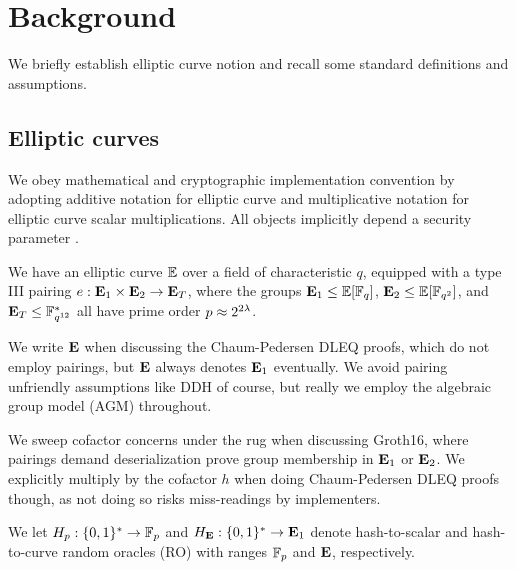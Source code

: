 
\section{Background}
\label{sec:background}

We briefly establish elliptic curve notion and recall some standard
definitions and assumptions.



\subsection{Elliptic curves}


We obey mathematical and cryptographic implementation convention by 
adopting additive notation for elliptic curve and multiplicative notation
for elliptic curve scalar multiplications.
%
All objects implicitly depend a security parameter \secparam.

We have an elliptic curve ${\mathbb{E}}$ over a field of characteristic $q$,
equipped with a type III pairing $e : {\mathbf{E}}_1 \times {\mathbf{E}}_2 \to {\mathbf{E}}_T$,
where the groups  ${\mathbf{E}}_1 \le {\mathbb{E}}[\mathbb{F}_q]$, ${\mathbf{E}}_2 \le {\mathbb{E}}[\mathbb{F}_{q^2}]$, and
${\mathbf{E}}_T \le \mathbb{F}^*_{q^{12}}$ all have prime order $p \approx 2^{2\lambda}$.

We write ${\mathbf{E}}$ when discussing the Chaum-Pedersen DLEQ proofs, which do
not employ pairings, but ${\mathbf{E}}$ always denotes ${\mathbf{E}}_1$ eventually.
We avoid pairing unfriendly assumptions like DDH of course, but really
we employ the algebraic group model (AGM) throughout.

We sweep cofactor concerns under the rug when discussing Groth16,
where pairings demand deserialization prove group membership in ${\mathbf{E}}_1$
or ${\mathbf{E}}_2$.  We explicitly multiply by the cofactor $h$ when doing
Chaum-Pedersen DLEQ proofs though, as not doing so risks miss-readings by implementers.

We let $H_p : \{0,1\}^* \to \mathbb{F}_p$ and $H_{\mathbf{E}} : \{0,1\}^* \to {\mathbf{E}}_1$
denote hash-to-scalar and hash-to-curve random oracles (RO) with ranges
$\mathbb{F}_p$ and ${\mathbf{E}}$, respectively.  

